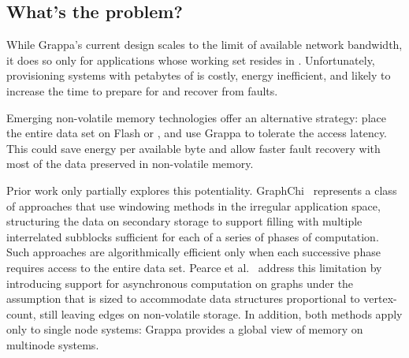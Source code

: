 \subsection{What's the problem?}

While Grappa's current design scales to the limit of available network
bandwidth, it does so only for applications whose working set resides
in \@.  Unfortunately, provisioning systems with petabytes of  is
costly, energy inefficient, and likely to increase the time to prepare
for and recover from faults.

Emerging non-volatile memory technologies offer an alternative strategy:
place the entire data set on Flash or , and
use Grappa to tolerate the access latency. This could save energy per available byte and allow
faster fault recovery with most of the data preserved in non-volatile memory.

Prior work only partially explores this potentiality. GraphChi~\cite{graphchi:osdi12}
represents a class of approaches that use windowing methods in the
irregular application space, structuring the data on secondary storage
to support filling  with multiple interrelated subblocks sufficient
for each of a series of phases of computation.  Such approaches are
algorithmically efficient only when each successive phase requires
access to the entire data set.  Pearce et al.~\cite{magt:2010} address this limitation by
introducing support for asynchronous computation on graphs under the
assumption that  is sized to accommodate data structures
proportional to vertex-count, still leaving edges on non-volatile
storage.  In addition, both methods apply only to single node systems:
Grappa provides a global view of memory on multinode systems.

